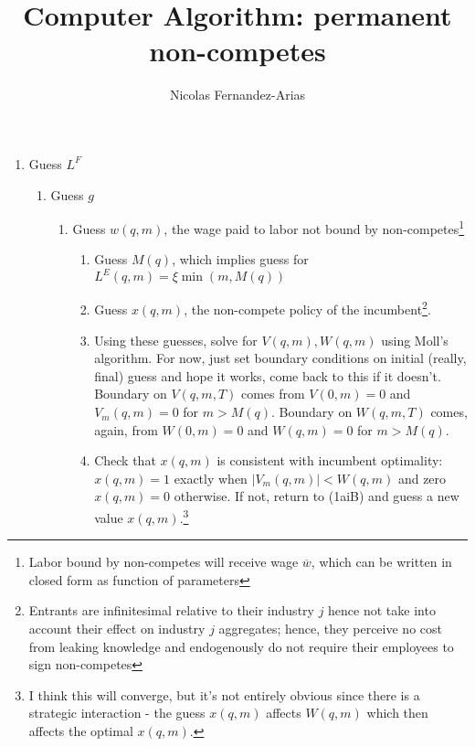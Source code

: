 \documentclass[12pt,english]{article}
\theoremstyle{remark}
\begin{document}
\title{Computer Algorithm: permanent non-competes}
\author{Nicolas Fernandez-Arias}
\maketitle
	
	
\begin{enumerate}
	\item Guess $L^F$
	\begin{enumerate}
		\item Guess $g$
		\begin{enumerate}
			\item Guess $w(q,m)$, the wage paid to labor not bound by non-competes\footnote{Labor bound by non-competes will receive wage $\overline{w}$, which can be written in closed form as function of parameters}
			\begin{enumerate}
				\item Guess $M(q)$, which implies guess for $L^E(q,m) = \xi \min(m,M(q))$
				
				\item Guess $x(q,m)$, the non-compete policy of the incumbent\footnote{Entrants are infinitesimal relative to their industry $j$ hence not take into account their effect on industry $j$ aggregates; hence, they perceive no cost from leaking knowledge and endogenously do not require their employees to sign non-competes}.
				
				\item Using these guesses, solve for $V(q,m),W(q,m)$ using Moll's algorithm. For now, just set boundary conditions on initial (really, final) guess and hope it works, come back to this if it doesn't. Boundary on $V(q,m,T)$ comes from $V(0,m) = 0$ and $V_m(q,m) = 0$ for $m > M(q)$. Boundary on $W(q,m,T)$ comes, again, from $W(0,m) = 0$ and $W(q,m) = 0$ for $m > M(q)$.  
				
				\item Check that $x(q,m)$ is consistent with incumbent optimality: $x(q,m) = 1$ exactly when $|V_m(q,m)| < W(q,m)$ and zero $x(q,m) = 0$ otherwise. If not, return to (1aiB) and guess a new value $x(q,m)$.\footnote{I think this will converge, but it's not entirely obvious since there is a strategic interaction - the guess $x(q,m)$ affects $W(q,m)$ which then affects the optimal $x(q,m)$.} 
				

\end{enumerate}
\end{enumerate}
\end{enumerate}
\end{enumerate}
\end{document}
